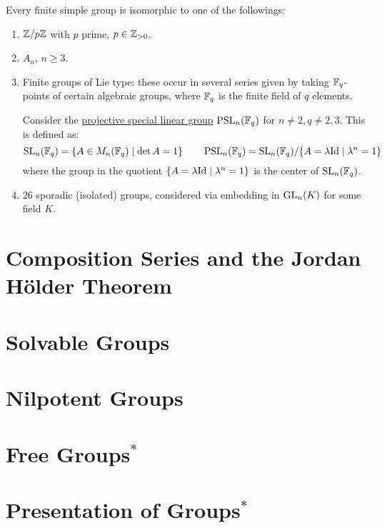 \documentclass{article}
\begin{document}
\begin{theorem}
    Every finite simple group is isomorphic to one of the followings:
    \begin{enumerate}
        \item $\mathbb{Z}/p\mathbb{Z}$ with $p$ prime, $p \in \mathbb{Z}_{> 0}$.
        \item $A_n$, $n \geq 3$.
        \item Finite groups of Lie type: these occur in several series given by taking $\mathbb{F}_q$-points of certain algebraic groups, where $\mathbb{F}_q$ is the finite field of $q$ elements.
        \begin{example}
            Consider the \underline{projective special linear group} $\operatorname{PSL}_n(\mathbb{F}_q)$ for $n \neq 2, q \neq 2, 3$. This is defined as:
            \[
                \operatorname{SL}_n(\mathbb{F}_q) = \{A \in M_n(\mathbb{F}_q) \mid \det A = 1\} \qquad \operatorname{PSL}_n(\mathbb{F}_q) = \operatorname{SL}_n(\mathbb{F}_q)/\{A = \lambda \mathrm{Id} \mid \lambda^n = 1\}
            \]
            where the group in the quotient $\{A = \lambda \mathrm{Id} \mid \lambda^n = 1\}$ is the center of $\operatorname{SL}_n(\mathbb{F}_q)$.
        \end{example}
        \item 26 sporadic (isolated) groups, considered via embedding in $\mathrm{GL}_n(K)$ for some field $K$. 
    \end{enumerate}
\end{theorem}

\section{Composition Series and the Jordan H\"older Theorem}

\section{Solvable Groups}

\section{Nilpotent Groups}

\section{Free Groups$^{\ast}$}

\section{Presentation of Groups$^{\ast}$}
\end{document}
